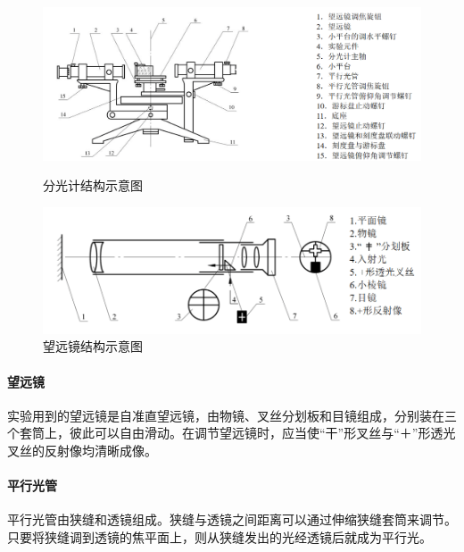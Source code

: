 \documentclass[UTF8,a4paper]{article}%
\begin{document}
\begin{figure}[H] %
    \centering
    \begin{minipage}[t]{0.5\linewidth}
        \centering
        \includegraphics[width=0.95\linewidth]{分光计.png}
        \caption{分光计结构示意图}
        \label{}
    \end{minipage}%
    \begin{minipage}[t]{0.5\linewidth}
        \centering
        \includegraphics[width=0.95\linewidth]{望远镜.png}
        \caption{望远镜结构示意图}
        \label{}
    \end{minipage}
\end{figure}

\paragraph{望远镜}
实验用到的望远镜是自准直望远镜，由物镜、叉丝分划板和目镜组成，分别装在三个套筒上，彼此可以自由滑动。在调节望远镜时，应当使“干”形叉丝与“＋”形透光叉丝的反射像均清晰成像。

\paragraph{平行光管}
平行光管由狭缝和透镜组成。狭缝与透镜之间距离可以通过伸缩狭缝套筒来调节。只要将狭缝调到透镜的焦平面上，则从狭缝发出的光经透镜后就成为平行光。
\end{document}
